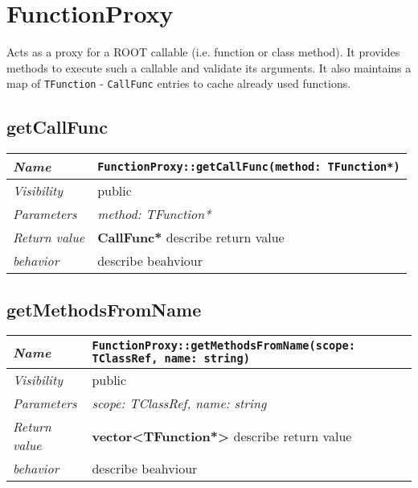 \chapter{FunctionProxy}
	Acts as a proxy for a ROOT callable (i.e. function or class method). It provides methods to execute such a callable and validate its arguments. It also maintains a map of \texttt{TFunction} - \texttt{CallFunc} entries to cache already used functions.

\section{getCallFunc}
\begin{longtable}{p{3cm} @{\hskip 1cm} p{12cm}}
	\hline

	\textit{Name} & \texttt{FunctionProxy::getCallFunc(method: TFunction*)}\\
	\hline

	\textit{Visibility} & public\\
	\hline

	\textit{Parameters} & \textit{method: TFunction*}\\
	\hline

	\textit{Return value} & \textbf{ CallFunc*} describe return value\\
	\hline

	\textit{behavior} & describe beahviour \\
	\hline

\end{longtable} \pagebreak

\section{getMethodsFromName}
\begin{longtable}{p{3cm} @{\hskip 1cm} p{12cm}}
	\hline

	\textit{Name} & \texttt{FunctionProxy::getMethodsFromName(scope: TClassRef, name: string)}\\
	\hline

	\textit{Visibility} & public\\
	\hline

	\textit{Parameters} & \textit{scope: TClassRef, name: string}\\
	\hline

	\textit{Return value} & \textbf{ vector<TFunction*>} describe return value\\
	\hline

	\textit{behavior} & describe beahviour \\
	\hline

\end{longtable} \pagebreak

